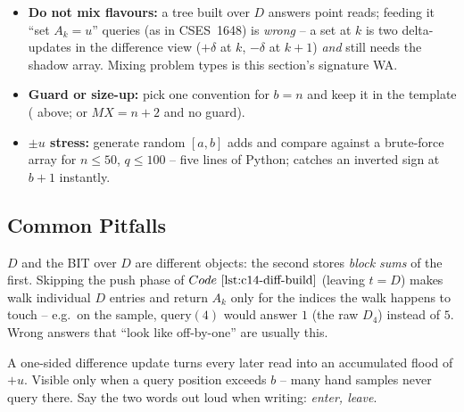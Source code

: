 \begin{hardeningbox}
\begin{itemize}[nosep,leftmargin=1.4em]
  \item \textbf{Do not mix flavours:} a tree built over \(D\) answers point
        reads; feeding it ``set \(A_k=u\)'' queries (as in CSES~1648) is
        \emph{wrong} -- a set at \(k\) is two delta-updates in the difference
        view (\(+\delta\) at \(k\), \(-\delta\) at \(k{+}1\)) \emph{and}
        still needs the shadow array.  Mixing problem types is this
        section's signature WA.
  \item \textbf{Guard or size-up:} pick one convention for \(b=n\) and keep
        it in the template ( above; or \(MX=n+2\) and no
        guard).
  \item \textbf{\(\pm u\) stress:} generate random \([a,b]\) adds and compare
         against a brute-force array for \(n\le50\), \(q\le100\)
        -- five lines of Python; catches an inverted sign at \(b{+}1\)
        instantly.
\end{itemize}
\end{hardeningbox}

\subsection{Common Pitfalls}

\begin{warningbox}
\(D\) and the BIT over \(D\) are different objects: the second stores
\emph{block sums} of the first.  Skipping the push phase of
\(\coderef{c14-diff-build}\) (leaving \(t=D\)) makes  walk
individual \(D\) entries and return \(A_k\) only for the indices the walk
happens to touch -- e.g.\ on the sample, \(\text{query}(4)\) would answer
\(1\) (the raw \(D_4\)) instead of \(5\).  Wrong answers that ``look like
off-by-one'' are usually this.
\end{warningbox}

\begin{warningbox}
A one-sided difference update turns every later read into an accumulated
flood of \(+u\).  Visible only when a query position exceeds \(b\) -- many
hand samples never query there.  Say the two words out loud when writing:
\emph{enter, leave}.
\end{warningbox}

